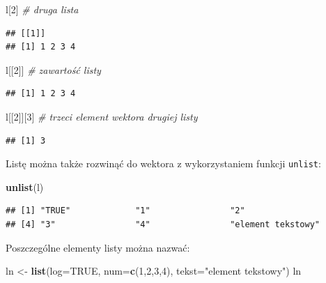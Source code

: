 \documentclass[]{book}
\newenvironment{Shaded}{\begin{snugshade}}{\end{snugshade}}
\newcommand{\KeywordTok}[1]{\textcolor[rgb]{0.13,0.29,0.53}{\textbf{#1}}}
\newcommand{\DataTypeTok}[1]{\textcolor[rgb]{0.13,0.29,0.53}{#1}}
\newcommand{\DecValTok}[1]{\textcolor[rgb]{0.00,0.00,0.81}{#1}}
\newcommand{\StringTok}[1]{\textcolor[rgb]{0.31,0.60,0.02}{#1}}
\newcommand{\CommentTok}[1]{\textcolor[rgb]{0.56,0.35,0.01}{\textit{#1}}}
\newcommand{\OtherTok}[1]{\textcolor[rgb]{0.56,0.35,0.01}{#1}}
\newcommand{\NormalTok}[1]{#1}
\begin{document}
\begin{Shaded}
\begin{Highlighting}[]
\NormalTok{l[}\DecValTok{2}\NormalTok{] }\CommentTok{# druga lista}
\end{Highlighting}
\end{Shaded}

\begin{verbatim}
## [[1]]
## [1] 1 2 3 4
\end{verbatim}

\begin{Shaded}
\begin{Highlighting}[]
\NormalTok{l[[}\DecValTok{2}\NormalTok{]] }\CommentTok{# zawartość listy}
\end{Highlighting}
\end{Shaded}

\begin{verbatim}
## [1] 1 2 3 4
\end{verbatim}

\begin{Shaded}
\begin{Highlighting}[]
\NormalTok{l[[}\DecValTok{2}\NormalTok{]][}\DecValTok{3}\NormalTok{] }\CommentTok{# trzeci element wektora drugiej listy}
\end{Highlighting}
\end{Shaded}

\begin{verbatim}
## [1] 3
\end{verbatim}

Listę można także rozwinąć do wektora z wykorzystaniem funkcji
\texttt{unlist}:

\begin{Shaded}
\begin{Highlighting}[]
\KeywordTok{unlist}\NormalTok{(l)}
\end{Highlighting}
\end{Shaded}

\begin{verbatim}
## [1] "TRUE"             "1"                "2"               
## [4] "3"                "4"                "element tekstowy"
\end{verbatim}

Poszczególne elementy listy można nazwać:

\begin{Shaded}
\begin{Highlighting}[]
\NormalTok{ln <-}\StringTok{ }\KeywordTok{list}\NormalTok{(}\DataTypeTok{log=}\OtherTok{TRUE}\NormalTok{, }\DataTypeTok{num=}\KeywordTok{c}\NormalTok{(}\DecValTok{1}\NormalTok{,}\DecValTok{2}\NormalTok{,}\DecValTok{3}\NormalTok{,}\DecValTok{4}\NormalTok{), }\DataTypeTok{tekst=}\StringTok{"element tekstowy"}\NormalTok{)}
\NormalTok{ln}
\end{Highlighting}
\end{Shaded}
\end{document}
